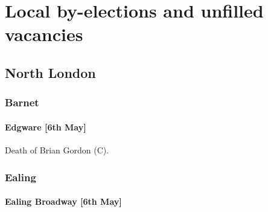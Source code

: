 \documentclass[a4paper,openany]{book}
\begin{document}
\chapter{Local by-elections and unfilled vacancies}

\begin{resultsiii}

%
%
%
%
%

\section{North London}

\subsection*{Barnet}

\subsubsection*{Edgware \hspace*{\fill}\nolinebreak[1]%
	\enspace\hspace*{\fill}
	[6th May]}


Death of Brian Gordon (C).

\subsection*{Ealing}

\subsubsection*{Ealing Broadway \hspace*{\fill}\nolinebreak[1]%
	\enspace\hspace*{\fill}
	[6th May]}


\end{resultsiii}
\end{document}
